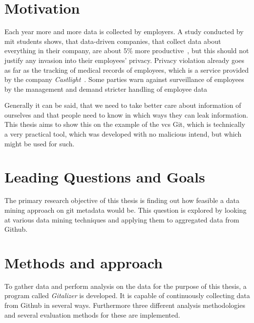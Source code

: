 \section{Motivation}
Each year more and more data is collected by employers.
A study conducted by \ac{mit} students shows, that data-driven companies, that collect data about everything in their company, are about 5\% more productive~\cite{article:management-revolution}, but this should not justify any invasion into their employees' privacy.
Privacy violation already goes as far as the tracking of medical records of employees, which is a service provided by the company \emph{Castlight}~\cite{article:medical-data}.
Some parties warn against surveillance of employees by the management and demand stricter handling of employee data~\cite{article:vermessung-belegschaft}

Generally it can be said, that we need to take better care about information of ourselves and that people need to know in which ways they can leak information.
This thesis aims to show this on the example of the \ac{vcs} Git, which is technically a very practical tool, which was developed with no malicious intend, but which might be used for such.

\section{Leading Questions and Goals}

The primary research objective of this thesis is finding out how feasible a data mining approach on git metadata would be.
This question is explored by looking at various data mining techniques and applying them to aggregated data from Github.

\section{Methods and approach}

To gather data and perform analysis on the data for the purpose of this thesis, a program called \emph{Gitalizer} is developed.
It is capable of continuously collecting data from Github in several ways.
Furthermore three different analysis methodologies and several evaluation methods for these are implemented.

